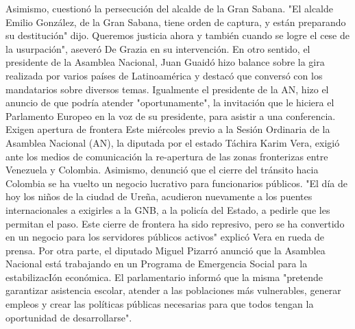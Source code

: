 \documentclass{article}%
\begin{document}
\newline%
%
Asimismo, cuestionó la persecución del alcalde de la Gran Sabana. "El alcalde Emilio González, de la Gran Sabana, tiene orden de captura, y están preparando su destitución" dijo.%
\newline%
%
Queremos justicia ahora y también cuando se logre el cese de la usurpación", aseveró De Grazia en su intervención.\newline%
En otro sentido, el presidente de la Asamblea Nacional, Juan Guaidó hizo balance sobre la gira realizada  por varios países de Latinoamérica y destacó que conversó con los mandatarios sobre diversos temas.%
\newline%
%
Igualmente el presidente de la AN, hizo el anuncio de que podría atender "oportunamente", la invitación que le hiciera el Parlamento Europeo en la voz de su presidente, para asistir a una conferencia.%
\newline%
%
Exigen apertura de frontera%
\newline%
%
Este miércoles previo a la Sesión Ordinaria de la Asamblea Nacional (AN), la diputada por el estado Táchira Karim Vera, exigió ante los medios de comunicación la re{-}apertura de las zonas fronterizas entre Venezuela y Colombia. Asimismo, denunció que el cierre del tránsito hacia Colombia se ha vuelto un negocio lucrativo para funcionarios públicos.%
\newline%
%
"El día de hoy los niños de la ciudad de Ureña, acudieron nuevamente a los puentes internacionales a exigirles a la GNB, a la policía del Estado, a pedirle que les permitan el paso. Este cierre de frontera ha sido represivo, pero se ha convertido en un negocio para los servidores públicos activos" explicó Vera en rueda de prensa.%
\newline%
%
Por otra parte, el diputado Miguel Pizarró anunció que la Asamblea Nacional está trabajando en un Programa de Emergencia Social para la estabilizacIón económica. El parlamentario informó que la misma "pretende garantizar asistencia escolar, atender a las poblaciones más vulnerables, generar empleos y crear las políticas públicas necesarias para que todos tengan la oportunidad de desarrollarse".%
\newline%
%
\end{document}
